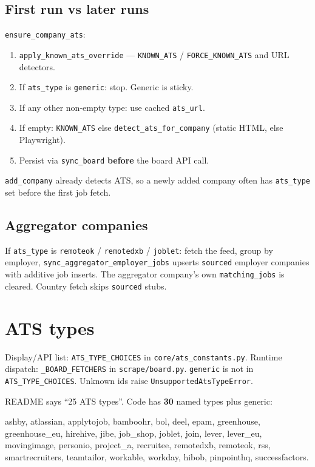 \documentclass[11pt,a4paper]{article}
\begin{document}
\subsection{First run vs later runs}

\texttt{ensure\_company\_ats}:

\begin{enumerate}
  \item \texttt{apply\_known\_ats\_override} --- \texttt{KNOWN\_ATS} /
        \texttt{FORCE\_KNOWN\_ATS} and URL detectors.
  \item If \texttt{ats\_type} is \texttt{generic}: stop. Generic is sticky.
  \item If any other non-empty type: use cached \texttt{ats\_url}.
  \item If empty: \texttt{KNOWN\_ATS} else \texttt{detect\_ats\_for\_company}
        (static HTML, else Playwright).
  \item Persist via \texttt{sync\_board} \textbf{before} the board API call.
\end{enumerate}

\texttt{add\_company} already detects ATS, so a newly added company often has
\texttt{ats\_type} set before the first job fetch.

\subsection{Aggregator companies}

If \texttt{ats\_type} is \texttt{remoteok} / \texttt{remotedxb} /
\texttt{joblet}: fetch the feed, group by employer,
\texttt{sync\_aggregator\_employer\_jobs} upserts \texttt{sourced} employer
companies with additive job inserts. The aggregator company's own
\texttt{matching\_jobs} is cleared. Country fetch skips \texttt{sourced}
stubs.

\section{ATS types}

Display/API list: \texttt{ATS\_TYPE\_CHOICES} in
\texttt{core/ats\_constants.py}. Runtime dispatch:
\texttt{\_BOARD\_FETCHERS} in \texttt{scrape/board.py}. \texttt{generic} is
not in \texttt{ATS\_TYPE\_CHOICES}. Unknown ids raise
\texttt{UnsupportedAtsTypeError}.

README says ``25 ATS types''. Code has \textbf{30} named types plus generic:

ashby, atlassian, applytojob, bamboohr, bol, deel, epam, greenhouse,
greenhouse\_eu, hirehive, jibe, job\_shop, joblet, join, lever, lever\_eu,
movingimage, personio, project\_a, recruitee, remotedxb, remoteok, rss,
smartrecruiters, teamtailor, workable, workday, hibob, pinpointhq,
successfactors.
\end{document}
